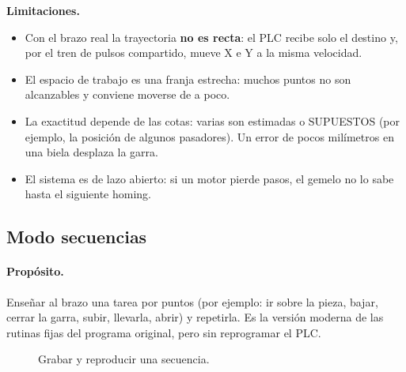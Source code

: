 \documentclass[a4paper,11pt]{article}
\newcommand{\limite}[1]{\par\smallskip\noindent\colorbox{rojo!8}{\parbox{\dimexpr\linewidth-2\fboxsep}{\textbf{\color{rojo}Limitaciones.} #1}}\par\smallskip}
\begin{document}
\limite{\begin{itemize}[leftmargin=5mm, topsep=0pt]
\item Con el brazo real la trayectoria \textbf{no es recta}: el PLC recibe solo el destino y, por el tren de pulsos compartido, mueve X e Y a la misma velocidad.
\item El espacio de trabajo es una franja estrecha: muchos puntos no son alcanzables y conviene moverse de a poco.
\item La exactitud depende de las cotas: varias son estimadas o SUPUESTOS (por ejemplo, la posición de algunos pasadores). Un error de pocos milímetros en una biela desplaza la garra.
\item El sistema es de lazo abierto: si un motor pierde pasos, el gemelo no lo sabe hasta el siguiente homing.
\end{itemize}}

\subsection{Modo secuencias}

\paragraph{Propósito.} Enseñar al brazo una tarea por puntos (por ejemplo: ir sobre la pieza, bajar, cerrar la garra, subir, llevarla, abrir) y repetirla. Es la versión moderna de las rutinas fijas del programa original, pero sin reprogramar el PLC.

\begin{figure}[H]
\centering
{}
\caption{Grabar y reproducir una secuencia.}
\end{figure}
\end{document}
